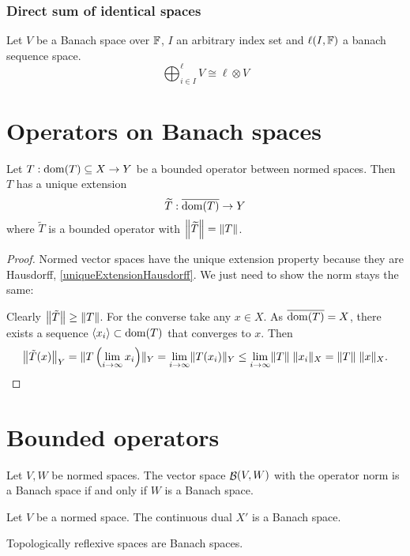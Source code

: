 \subsubsection{Direct sum of identical spaces}
\begin{proposition}
Let $V$ be a Banach space over $\F$, $I$ an arbitrary index set and $\ell(I,\F)$ a banach sequence space.
\[ \bigoplus_{i\in I}^\ell V \cong \ell\otimes V \]
\end{proposition}


\section{Operators on Banach spaces}
\begin{proposition} \label{BLT}
Let $T:\dom(T)\subseteq X\to Y$ be a bounded operator between normed spaces. Then $T$ has a unique extension
\[ \widetilde{T}:\overline{\dom(T)}\to Y \]
where $\widetilde{T}$ is a bounded operator with $\norm*{\widetilde{T}} = \norm{T}$.
\end{proposition}
\begin{proof}
Normed vector spaces have the unique extension property because they are Hausdorff, \ref{uniqueExtensionHausdorff}. We just need to show the norm stays the same:

Clearly $\norm*{\tilde{T}} \geq \norm{T}$. For the converse take any $x\in X$. As $\overline{\dom(T)} = X$, there exists a sequence $\seq{x_i}\subset \dom(T)$ that converges to $x$. Then
\[ \norm*{\tilde{T}(x)}_Y = \norm{T\left(\lim_{i\to\infty}x_i\right)}_Y = \lim_{i\to\infty}\norm{T(x_i)}_Y \leq \lim_{i\to\infty}\norm{T}\;\norm{x_i}_X = \norm{T}\;\norm{x}_X. \]
\end{proof}

\section{Bounded operators}
\begin{proposition}
Let $V,W$ be normed spaces. The vector space $\Bounded(V,W)$ with the operator norm is a Banach space \textup{if and only if} $W$ is a Banach space.
\end{proposition}
\begin{corollary}
Let $V$ be a normed space. The continuous dual $X'$ is a Banach space.
\end{corollary}
\begin{corollary}
Topologically reflexive spaces are Banach spaces.
\end{corollary}

